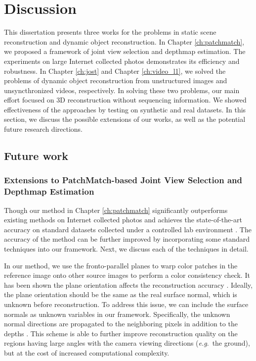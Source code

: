 \chapter{Discussion}
\label{ch:discussion}
This dissertation presents three works for the problems in static scene reconstruction and dynamic object reconstruction. In Chapter \ref{ch:patchmatch}, we proposed a framework of joint view selection and depthmap estimation. The experiments on large Internet collected photos demonstrates its efficiency and robustness. In Chapter \ref{ch:jost} and Chapter \ref{ch:video_l1}, we solved the problems of dynamic object reconstruction from unstructured images and unsyncthronized videos, respectively. In solving these two problems, our main effort focused on 3D reconstruction without sequencing information. We showed effectiveness of the approaches by testing on synthetic and real datasets. In this section, we discuss the possible extensions of our works, as well as the potential future research directions.

\section{Future work}

\subsection{Extensions to PatchMatch-based Joint View Selection and Depthmap Estimation}
\label{sec:patchmatch_extensions}

Though our method in Chapter \ref{ch:patchmatch} significantly outperforms existing methods on Internet collected photos \cite{Goesele07} and achieves the state-of-the-art accuracy on standard datasets collected under a controlled lab environment \cite{Strecha08}. The accuracy of the method can be further improved by incorporating some standard techniques into our framework. Next, we discuss each of the techniques in detail.

In our method, we use the fronto-parallel planes to warp color patches in the reference image onto other source images to perform a color consistency check. It has been shown the plane orientation affects the reconstruction accuracy \cite{Gallup07,FURUKAWA_PAMI2010}. Ideally, the plane orientation should be the same as the real surface normal, which is unknown before reconstruction. To address this issue, we can include the surface normals as unknown variables in our framework. Specifically, the unknown normal directions are propagated to the neighboring pixels in addition to the depths \cite{patchMatchStereo1}. This scheme is able to further improve reconstruction quality on the regions having large angles with the camera viewing directions (\emph{e.g}.~the ground), but at the cost of increased computational complexity.

